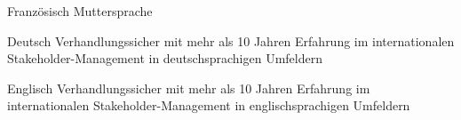 

\begin{cvskills}
  \cvskill
    {Französisch} %
    {Muttersprache} %

  \cvskill
    {Deutsch} %
    {Verhandlungssicher mit mehr als 10 Jahren Erfahrung im internationalen Stakeholder-Management in deutschsprachigen Umfeldern} %

  \cvskill
    {Englisch} %
    {Verhandlungssicher mit mehr als 10 Jahren Erfahrung im internationalen Stakeholder-Management in englischsprachigen Umfeldern} %

\end{cvskills}
